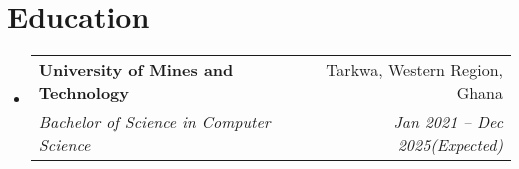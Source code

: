 \documentclass[a4paper,11pt]{article}
\makeatletter
\newcommand{\resumeItem}[1]{
	\item\small{#1}
}
\newcommand{\resumeItemListStart}{\begin{itemize}[rightmargin=0.11in]}
\newcommand{\resumeItemListEnd}{\end{itemize}}
\newcommand{\resumeQuadHeading}[4]{
	\item
	\begin{tabular*}{0.96\textwidth}[t]{l@{\extracolsep{\fill}}r}
		\textbf{#1} & #2 \\
		\textit{\small#3} & \textit{\small #4} \\
	\end{tabular*}
}
\newcommand{\resumeQuadHeadingChild}[2]{
	\item
	\begin{tabular*}{0.96\textwidth}[t]{l@{\extracolsep{\fill}}r}
		\textbf{\small#1} & {\small#2} \\
	\end{tabular*}
}
\newcommand{\resumeHeadingListStart}{
	\begin{itemize}[leftmargin=0.15in, label={}]
	}
\newcommand{\resumeHeadingListEnd}{\end{itemize}}
\makeatother
\begin{document}






	\section{Education}
	\resumeHeadingListStart{}
	\resumeQuadHeading{University of Mines and Technology}{Tarkwa, Western Region, Ghana}
	{Bachelor of Science in Computer Science}{Jan 2021 -- Dec 2025(Expected)}
	\resumeHeadingListEnd{}


\end{document}
